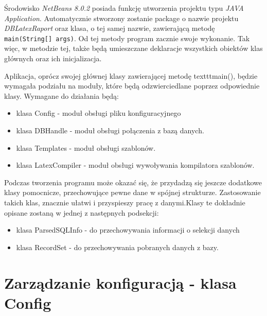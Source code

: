 Środowisko \emph{NetBeans 8.0.2} posiada funkcję utworzenia projektu typu \emph{JAVA Application}. Automatycznie stworzony zostanie package o nazwie projektu \emph{DBLatexRaport} oraz klasa, o tej samej nazwie, zawierającą metodę \texttt{main(String[] args)}. Od tej metody program zacznie swoje wykonanie. Tak więc, w metodzie tej, także będą umieszczane deklaracje wszystkich obiektów klas głównych oraz ich inicjalizacja. 
\par 
Aplikacja, oprócz swojej głównej klasy zawierającej metodę texttt{main()}, będzie wymagała podziału na moduły, które będą odzwierciedlane poprzez odpowiednie klasy. Wymagane do działania będą:
\begin{itemize}
\item klasa Config - moduł obsługi pliku konfiguracyjnego 
\item klasa DBHandle - moduł obsługi połączenia z bazą danych.
\item klasa Templates - moduł obsługi szablonów.
\item klasa LatexCompiler -  moduł obsługi wywoływania kompilatora szablonów.
\end{itemize}
\vspace{5mm}
Podczas tworzenia programu może okazać się, że przydadzą się jeszcze dodatkowe klasy pomocnicze, przechowujące pewne dane w spójnej strukturze. Zastosowanie takich klas, znacznie ułatwi i przyspieszy pracę z danymi.Klasy te dokładnie opisane zostaną w jednej z następnych podsekcji:
\begin{itemize}
\item klasa ParsedSQLInfo - do przechowywania informacji o selekcji danych
\item klasa RecordSet - do przechowywania pobranych danych z bazy.
\end{itemize}

\section{Zarządzanie konfiguracją - klasa Config}

